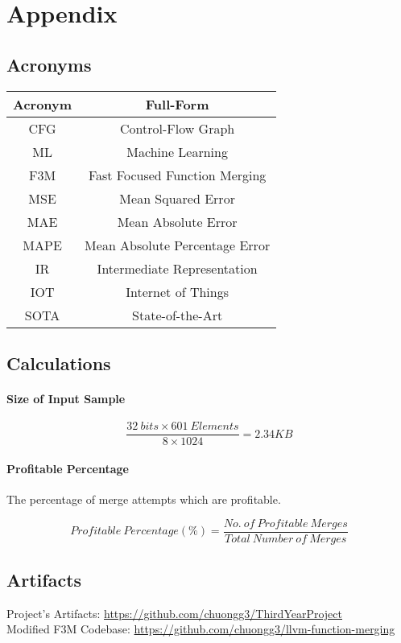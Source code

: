 \chapter{Appendix}
\section{Acronyms}

\begin{center}
\begin{tabular}{ |c|c| } 
 \hline
 \textbf{Acronym} & \textbf{Full-Form} \\ 
 \hline
 CFG & Control-Flow Graph \\ 
 ML & Machine Learning \\
 F3M & Fast Focused Function Merging\\
 MSE & Mean Squared Error\\
 MAE & Mean Absolute Error\\
 MAPE & Mean Absolute Percentage Error\\
 IR & Intermediate Representation\\
 IOT & Internet of Things\\
 SOTA & State-of-the-Art \\
 \hline
\end{tabular}
\end{center}


\section{Calculations}
\subsubsection{Size of Input Sample} \label{Calculation:InputSize}
$$\frac{32\ bits \times 601\ Elements}{8 \times 1024} = 2.34KB$$

\subsubsection{Profitable Percentage}
The percentage of merge attempts which are profitable. 

\begin{equation} \label{METRIC:ProfitablePercentage}
    Profitable\ Percentage (\%)=\frac{No.\ of\ Profitable\ Merges}{Total\ Number\ of\ Merges}
\end{equation}



\section{Artifacts} \label{Artifacts}
Project's Artifacts: \url{https://github.com/chuongg3/ThirdYearProject} \\
Modified F3M Codebase: \url{https://github.com/chuongg3/llvm-function-merging}
